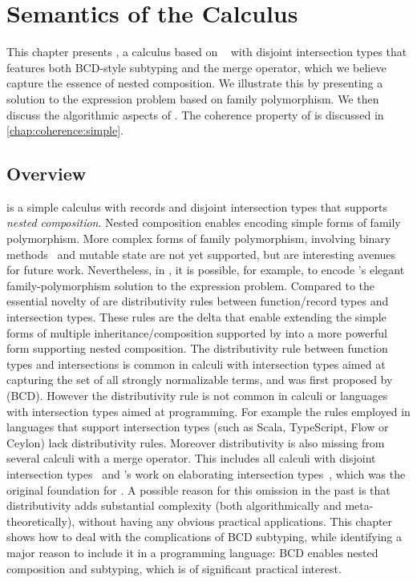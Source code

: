 
\chapter{Semantics of the \namee Calculus}
\label{chap:nested}

This chapter presents \namee, a calculus based on \oname~\citep{oliveira2016disjoint} with disjoint intersection types that
features both BCD-style subtyping and the merge operator, which we believe
capture the essence of nested composition. We illustrate this by presenting a
solution to the expression problem based on family polymorphism. We then discuss
the algorithmic aspects of \namee. The coherence property of \namee is discussed
in \cref{chap:coherence:simple}.

\section{Overview}

\namee is a simple calculus with records and disjoint intersection types that
supports \emph{nested composition}. Nested composition enables encoding simple
forms of family polymorphism. More complex forms of family polymorphism,
involving binary methods~\citep{bruce1995binary} and mutable state are not yet
supported, but are interesting avenues for future work. Nevertheless, in \namee,
it is possible, for example, to encode \citeauthor{Ernst_2001}'s elegant family-polymorphism
solution to the expression problem. Compared to \oname the essential novelty of
\namee are distributivity rules between function/record types and intersection
types. These rules are the delta that enable extending the simple forms of
multiple inheritance/composition supported by \oname into a more powerful form
supporting nested composition. The distributivity rule between function types
and intersections is common in calculi with intersection types aimed at
capturing the set of all strongly normalizable terms, and was first proposed by
\citet{Barendregt_1983} (BCD). However the distributivity rule is not common in
calculi or languages with intersection types aimed at programming. For example
the rules employed in languages that support intersection types (such as Scala,
TypeScript, Flow or Ceylon) lack distributivity rules. Moreover distributivity
is also missing from several calculi with a merge operator. This includes all
calculi with disjoint intersection types~\citep{oliveira2016disjoint, alpuimdisjoint}
and \citeauthor{dunfield2014elaborating}'s work on elaborating
intersection types~\citep{dunfield2014elaborating}, which was the original
foundation for \oname. A possible reason for this omission in the past is that
distributivity adds substantial complexity (both algorithmically and
meta-theoretically), without having any obvious practical applications. This
chapter shows how to deal with the complications of BCD subtyping, while
identifying a major reason to include it in a programming language: BCD enables
nested composition and subtyping, which is of significant practical interest.

